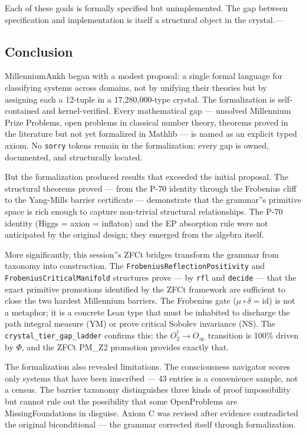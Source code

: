 \documentclass[12pt,a4paper]{article}
\begin{document}
Each of these goals is formally specified but unimplemented. The gap between specification and implementation is itself a structural object in the crystal.---

\subsection{Conclusion}

MillenniumAnkh began with a modest proposal: a single formal language for classifying systems across domains, not by unifying their theories but by assigning each a 12-tuple in a 17,280,000-type crystal. The formalization is self-contained and kernel-verified. Every mathematical gap --- unsolved Millennium Prize Problems, open problems in classical number theory, theorems proved in the literature but not yet formalized in Mathlib --- is named as an explicit typed axiom. No \texttt{sorry} tokens remain in the formalization: every gap is owned, documented, and structurally located.

But the formalization produced results that exceeded the initial proposal. The structural theorems proved --- from the P-70 identity through the Frobenius cliff to the Yang-Mills barrier certificate --- demonstrate that the grammar''s primitive space is rich enough to capture non-trivial structural relationships. The P-70 identity (Higgs = axion = inflaton) and the EP absorption rule were not anticipated by the original design; they emerged from the algebra itself.

More significantly, this session''s ZFCt bridges transform the grammar from taxonomy into construction. The \texttt{FrobeniusReflectionPositivity} and \texttt{FrobeniusCriticalManifold} structures prove --- by \texttt{rfl} and \texttt{decide} --- that the exact primitive promotions identified by the ZFCt framework are sufficient to close the two hardest Millennium barriers. The Frobenius gate ($\mu \circ \delta = \text{id}$) is not a metaphor; it is a concrete Lean type that must be inhabited to discharge the path integral measure (YM) or prove critical Sobolev invariance (NS). The \texttt{crystal\_tier\_gap\_ladder} confirms this: the $O_2^\dagger \to O_{\infty}$ transition is 100\% driven by $\Phi$, and the ZFCt PM\_Z2 promotion provides exactly that.

The formalization also revealed limitations. The consciousness navigator scores only systems that have been imscribed --- 43 entries is a convenience sample, not a census. The barrier taxonomy distinguishes three kinds of proof impossibility but cannot rule out the possibility that some OpenProblems are MissingFoundations in disguise. Axiom C was revised after evidence contradicted the original biconditional --- the grammar corrected itself through formalization.
\end{document}
